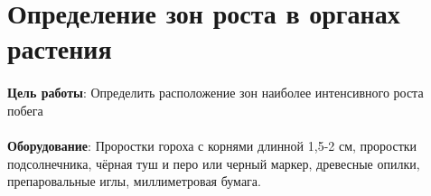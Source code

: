


\section*{\lbtitle Определение зон роста в органах растения}



\paragraph*{}\textbf{Цель работы}: Определить расположение зон наиболее интенсивного роста побега

\paragraph*{}\textbf{Оборудование}: Проростки гороха с корнями длинной 1,5-2 см, проростки подсолнечника, чёрная туш и перо или черный маркер, древесные опилки, препаровальные иглы, миллиметровая бумага.

